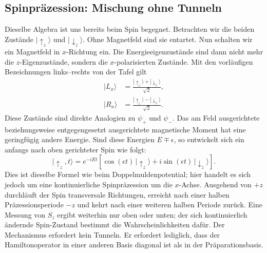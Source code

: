 \subsection{Spinpräzession: Mischung ohne Tunneln}

Dieselbe Algebra ist uns bereits beim Spin begegnet. Betrachten wir die beiden Zustände \(|\uparrow_z\rangle\) und \(|\downarrow_z\rangle\). Ohne Magnetfeld sind sie entartet. Nun schalten wir ein Magnetfeld in \(x\)-Richtung ein. Die Energieeigenzustände sind dann nicht mehr die \(z\)-Eigenzustände, sondern die \(x\)-polarisierten Zustände. Mit den vorläufigen Bezeichnungen links--rechts von der Tafel gilt
\begin{align}
|L_x\rangle &= \frac{|\uparrow_z\rangle+|\downarrow_z\rangle}{\sqrt{2}},\\
|R_x\rangle &= \frac{|\uparrow_z\rangle-|\downarrow_z\rangle}{\sqrt{2}}.
\end{align}
Diese Zustände sind direkte Analogien zu \(\psi_+\) und \(\psi_-\). Das am Feld ausgerichtete beziehungsweise entgegengesetzt ausgerichtete magnetische Moment hat eine geringfügig andere Energie. Sind diese Energien \(E\mp\epsilon\), so entwickelt sich ein anfangs nach oben gerichteter Spin wie folgt:
\begin{equation}
|\uparrow_z,t\rangle
= e^{-iEt}\left[\cos(\epsilon t)\,|\uparrow_z\rangle
+ i\sin(\epsilon t)\,|\downarrow_z\rangle\right].
\end{equation}
Dies ist dieselbe Formel wie beim Doppelmuldenpotential; hier handelt es sich jedoch um eine kontinuierliche Spinpräzession um die \(x\)-Achse. Ausgehend von \(+z\) durchläuft der Spin transversale Richtungen, erreicht nach einer halben Präzessionsperiode \(-z\) und kehrt nach einer weiteren halben Periode zurück. Eine Messung von \(S_z\) ergibt weiterhin nur oben oder unten; der sich kontinuierlich ändernde Spin-Zustand bestimmt die Wahrscheinlichkeiten dafür. Der Mechanismus erfordert kein Tunneln. Er erfordert lediglich, dass der Hamiltonoperator in einer anderen Basis diagonal ist als in der Präparationsbasis.

\begin{classroomqa}
\end{classroomqa}

